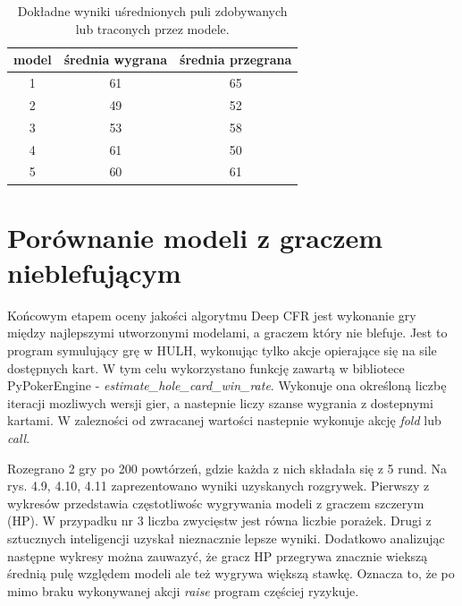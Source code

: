 \documentclass[12pt,oneside,a4paper]{report}
\begin{document}
\vspace{2cm}
\begin{table}
\centering
\caption{Dokładne wyniki uśrednionych puli zdobywanych lub traconych przez modele.}
\begin{tabular}{|c|c|c| }
   \hline
   model & średnia wygrana & średnia przegrana \\
    \hline
   1 & 61 & 65 \\ 
   \hline
   2 & 49 & 52  \\  
   \hline
   3 & 53 & 58 \\
   \hline
   4 & 61 & 50 \\
   \hline
   5 & 60 & 61 \\
   \hline
\end{tabular}
\end{table}



\vspace{20cm}
\section{Porównanie modeli z graczem nieblefującym}

Końcowym etapem oceny jakości algorytmu Deep CFR jest wykonanie gry między najlepszymi utworzonymi
modelami, a graczem który nie blefuje. Jest to program symulujący grę w HULH, wykonując tylko 
akcje opierające się na sile dostępnych kart.
W tym celu wykorzystano funkcję zawartą w bibliotece PyPokerEngine -
\emph{estimate\_hole\_card\_win\_rate}. Wykonuje ona określoną liczbę iteracji mozliwych wersji gier, a
nastepnie liczy szanse wygrania z dostepnymi kartami. W zalezności od zwracanej wartości
nastepnie wykonuje akcję \emph{fold} lub \emph{call}. 

Rozegrano 2 gry po 200 powtórzeń, gdzie każda z nich składała się z 5 rund. Na rys. 4.9, 4.10, 4.11 zaprezentowano
wyniki uzyskanych rozgrywek. Pierwszy z wykresów przedstawia częstotliwośc wygrywania modeli z
graczem szczerym (HP). W przypadku nr 3 liczba zwycięstw jest równa liczbie porażek. Drugi z
sztucznych inteligencji uzyskał nieznacznie lepsze wyniki. Dodatkowo analizując następne wykresy
można zauwazyć, że gracz HP przegrywa znacznie wiekszą średnią pulę względem modeli ale też wygrywa 
większą stawkę. Oznacza to, że po mimo braku wykonywanej akcji \emph{raise} program częściej
ryzykuje.
\end{document}
